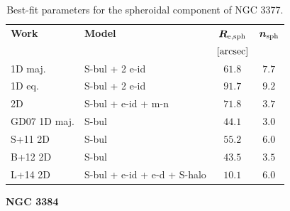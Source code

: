 \documentclass[preprint2]{emulateapj}
\begin{document}
  \begin{table}[h]
  \small
  \caption{Best-fit parameters for the spheroidal component of NGC 3377.}
  \begin{center}
  \begin{tabular}{llcc}
  \hline
  {\bf Work} & {\bf Model}   & $\bm R_{\rm e,sph}$    & $\bm n_{\rm sph}$ \\
    &  &  $[\rm arcsec]$ & \\
  \hline
  1D maj. & S-bul + 2 e-id     & $61.8$  &  $7.7$ \\
  1D eq.  & S-bul + 2 e-id     & $91.7$  &  $9.2$ \\
  2D      & S-bul + e-id + m-n & $71.8$  &  $3.7$ \\
  \hline
  GD07 1D maj.    & S-bul     		     & $44.1$  &  $3.0$ \\
  S+11 2D         & S-bul     		     & $55.2$  &  $6.0$ \\
  B+12 2D         & S-bul     		     & $43.5$  &  $3.5$ \\
  L+14 2D         & S-bul + e-id + e-d + S-halo & $10.1$  &  $6.0$ \\
  \hline
  \end{tabular}
  \end{center}
  \label{tab:n3377}
  \end{table}
  

  \clearpage\newpage\noindent
  {\bf NGC 3384 \\}
\end{document}
